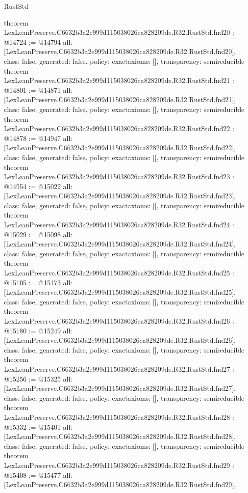 \begin{lexlean}{RustStd}
\begin{coremodule}
{}
theorem LexLeanPreserve.C6632b3a2e999d115038026ca828209de.R32.RustStd.fnd20 : @14724 := @14794 {
  all: [LexLeanPreserve.C6632b3a2e999d115038026ca828209de.R32.RustStd.fnd20],
  class: false,
  generated: false,
  policy: exact{axioms: []},
  transparency: semireducible
}
theorem LexLeanPreserve.C6632b3a2e999d115038026ca828209de.R32.RustStd.fnd21 : @14801 := @14871 {
  all: [LexLeanPreserve.C6632b3a2e999d115038026ca828209de.R32.RustStd.fnd21],
  class: false,
  generated: false,
  policy: exact{axioms: []},
  transparency: semireducible
}
theorem LexLeanPreserve.C6632b3a2e999d115038026ca828209de.R32.RustStd.fnd22 : @14878 := @14947 {
  all: [LexLeanPreserve.C6632b3a2e999d115038026ca828209de.R32.RustStd.fnd22],
  class: false,
  generated: false,
  policy: exact{axioms: []},
  transparency: semireducible
}
theorem LexLeanPreserve.C6632b3a2e999d115038026ca828209de.R32.RustStd.fnd23 : @14954 := @15022 {
  all: [LexLeanPreserve.C6632b3a2e999d115038026ca828209de.R32.RustStd.fnd23],
  class: false,
  generated: false,
  policy: exact{axioms: []},
  transparency: semireducible
}
theorem LexLeanPreserve.C6632b3a2e999d115038026ca828209de.R32.RustStd.fnd24 : @15029 := @15098 {
  all: [LexLeanPreserve.C6632b3a2e999d115038026ca828209de.R32.RustStd.fnd24],
  class: false,
  generated: false,
  policy: exact{axioms: []},
  transparency: semireducible
}
theorem LexLeanPreserve.C6632b3a2e999d115038026ca828209de.R32.RustStd.fnd25 : @15105 := @15173 {
  all: [LexLeanPreserve.C6632b3a2e999d115038026ca828209de.R32.RustStd.fnd25],
  class: false,
  generated: false,
  policy: exact{axioms: []},
  transparency: semireducible
}
theorem LexLeanPreserve.C6632b3a2e999d115038026ca828209de.R32.RustStd.fnd26 : @15180 := @15249 {
  all: [LexLeanPreserve.C6632b3a2e999d115038026ca828209de.R32.RustStd.fnd26],
  class: false,
  generated: false,
  policy: exact{axioms: []},
  transparency: semireducible
}
theorem LexLeanPreserve.C6632b3a2e999d115038026ca828209de.R32.RustStd.fnd27 : @15256 := @15325 {
  all: [LexLeanPreserve.C6632b3a2e999d115038026ca828209de.R32.RustStd.fnd27],
  class: false,
  generated: false,
  policy: exact{axioms: []},
  transparency: semireducible
}
theorem LexLeanPreserve.C6632b3a2e999d115038026ca828209de.R32.RustStd.fnd28 : @15332 := @15401 {
  all: [LexLeanPreserve.C6632b3a2e999d115038026ca828209de.R32.RustStd.fnd28],
  class: false,
  generated: false,
  policy: exact{axioms: []},
  transparency: semireducible
}
theorem LexLeanPreserve.C6632b3a2e999d115038026ca828209de.R32.RustStd.fnd29 : @15408 := @15477 {
  all: [LexLeanPreserve.C6632b3a2e999d115038026ca828209de.R32.RustStd.fnd29],
}
\end{coremodule}
\end{lexlean}
